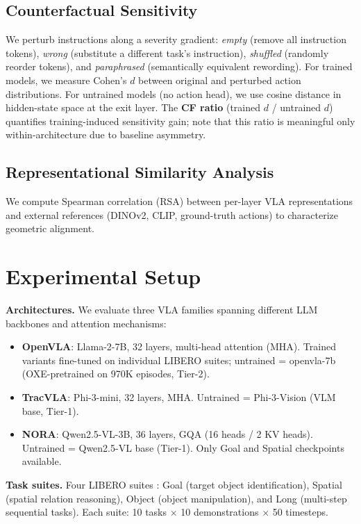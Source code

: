 \documentclass[10pt,twocolumn]{article}
\begin{document}
\subsection{Counterfactual Sensitivity}
We perturb instructions along a severity gradient: \emph{empty} (remove all instruction tokens), \emph{wrong} (substitute a different task's instruction), \emph{shuffled} (randomly reorder tokens), and \emph{paraphrased} (semantically equivalent rewording).
For trained models, we measure Cohen's $d$ between original and perturbed action distributions. For untrained models (no action head), we use cosine distance in hidden-state space at the exit layer. The \textbf{CF ratio} (trained $d$ / untrained $d$) quantifies training-induced sensitivity gain; note that this ratio is meaningful only within-architecture due to baseline asymmetry.

\subsection{Representational Similarity Analysis}
We compute Spearman correlation (RSA) between per-layer VLA representations and external references (DINOv2, CLIP, ground-truth actions) to characterize geometric alignment.

\section{Experimental Setup}
\label{sec:setup}

\textbf{Architectures.}
We evaluate three VLA families spanning different LLM backbones and attention mechanisms:
\begin{itemize}[nosep,leftmargin=*]
  \item \textbf{OpenVLA}: Llama-2-7B, 32 layers, multi-head attention (MHA). Trained variants fine-tuned on individual LIBERO suites; untrained = openvla-7b (OXE-pretrained on 970K episodes, Tier-2).
  \item \textbf{TracVLA}: Phi-3-mini, 32 layers, MHA. Untrained = Phi-3-Vision (VLM base, Tier-1).
  \item \textbf{NORA}: Qwen2.5-VL-3B, 36 layers, GQA (16 heads / 2 KV heads). Untrained = Qwen2.5-VL base (Tier-1). Only Goal and Spatial checkpoints available.
\end{itemize}

\textbf{Task suites.}
Four LIBERO suites \cite{libero}: Goal (target object identification), Spatial (spatial relation reasoning), Object (object manipulation), and Long (multi-step sequential tasks).
Each suite: 10 tasks $\times$ 10 demonstrations $\times$ 50 timesteps.
\end{document}
